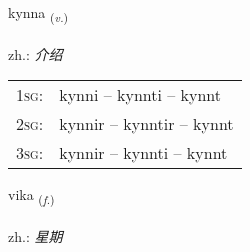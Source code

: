 \documentclass[frontgrid, backgrid]{flacards}\usepackage[]{graphicx}\usepackage[]{xcolor}
\begin{document}
\renewcommand{\flhead}{\vskip5pt \fboxsep=0pt {\small\bfseries\footnotesize Sagnorð | 动词}}
\renewcommand{\fcfoot}{\vskip5pt \fboxsep=0pt \hspace{2pt}{\small\bfseries\footnotesize 1K}}

\renewcommand{\blhead}{\vskip5pt {\small\bfseries\footnotesize Sagnorð | 动词 }}
\renewcommand{\bcfoot}{\vskip5pt \hspace{2pt}{\small\bfseries\footnotesize 1K}}


{kynna \small{\textsubscript{(\textit{v.})}} \\[1ex] %
\textphonetic{[cʰɪna]} \\
zh.: \emph{介绍} \\  [2ex]
\renewcommand*{\arraystretch}{0.8}
\begin{tabular}{p{1cm}l}
\textsc{1sg}: & kynni -- kynnti -- kynnt \\ 
\textsc{2sg}: & kynnir -- kynntir -- kynnt \\ 
\textsc{3sg}: & kynnir -- kynnti -- kynnt \\ 
\end{tabular}
}

\renewcommand{\flhead}{\vskip5pt \fboxsep=0pt {\small\bfseries\footnotesize Nafnorð | 名词}}
\renewcommand{\fcfoot}{\vskip5pt \fboxsep=0pt \hspace{2pt}{\small\bfseries\footnotesize 1K}}

\renewcommand{\blhead}{\vskip5pt {\small\bfseries\footnotesize Nafnorð | 名词 }}
\renewcommand{\bcfoot}{\vskip5pt \hspace{2pt}{\small\bfseries\footnotesize 1K}}


{vika \small{\textsubscript{(\textit{f.})}} \\[1ex] %
\textphonetic{[vɪːka]} \\
zh.: \emph{星期} \\  [2ex]
\renewcommand*{\arraystretch}{0.8}
}
\end{document}

